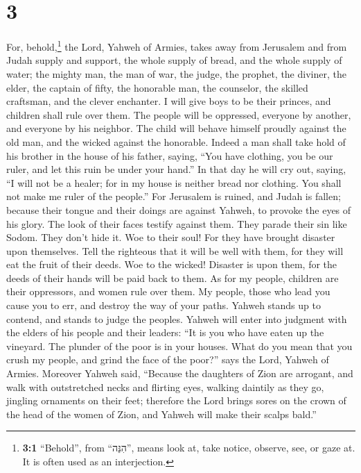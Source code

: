 \hypertarget{section-2}{%
\section{3}\label{section-2}}

 For, behold,\footnote{\textbf{3:1} ``Behold'', from
  ``הִנֵּה'', means look at, take notice, observe, see, or gaze at. It
  is often used as an interjection.} the Lord, Yahweh of Armies, takes
away from Jerusalem and from Judah supply and support, the whole supply
of bread, and the whole supply of water;  the mighty man,
the man of war, the judge, the prophet, the diviner, the elder,
 the captain of fifty, the honorable man, the counselor,
the skilled craftsman, and the clever enchanter.  I will
give boys to be their princes, and children shall rule over them.
 The people will be oppressed, everyone by another, and
everyone by his neighbor. The child will behave himself proudly against
the old man, and the wicked against the honorable.  Indeed
a man shall take hold of his brother in the house of his father, saying,
``You have clothing, you be our ruler, and let this ruin be under your
hand.''  In that day he will cry out, saying, ``I will not
be a healer; for in my house is neither bread nor clothing. You shall
not make me ruler of the people.''  For Jerusalem is
ruined, and Judah is fallen; because their tongue and their doings are
against Yahweh, to provoke the eyes of his glory.  The
look of their faces testify against them. They parade their sin like
Sodom. They don't hide it. Woe to their soul! For they have brought
disaster upon themselves.  Tell the righteous that it
will be well with them, for they will eat the fruit of their deeds.
 Woe to the wicked! Disaster is upon them, for the deeds
of their hands will be paid back to them.  As for my
people, children are their oppressors, and women rule over them. My
people, those who lead you cause you to err, and destroy the way of your
paths.  Yahweh stands up to contend, and stands to judge
the peoples.  Yahweh will enter into judgment with the
elders of his people and their leaders: ``It is you who have eaten up
the vineyard. The plunder of the poor is in your houses. 
What do you mean that you crush my people, and grind the face of the
poor?'' says the Lord, Yahweh of Armies.  Moreover Yahweh
said, ``Because the daughters of Zion are arrogant, and walk with
outstretched necks and flirting eyes, walking daintily as they go,
jingling ornaments on their feet;  therefore the Lord
brings sores on the crown of the head of the women of Zion, and Yahweh
will make their scalps bald.''

